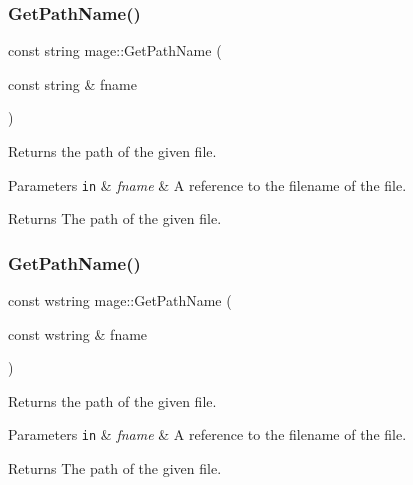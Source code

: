 \hypertarget{namespacemage_ab3642c6ef6cf94a62fb37b40c3c2f57e}{}\label{namespacemage_ab3642c6ef6cf94a62fb37b40c3c2f57e} 
\subsubsection{\texorpdfstring{Get\+Path\+Name()}{GetPathName()}\hspace{0.1cm}{\footnotesize\ttfamily [1/2]}}
{\footnotesize\ttfamily const string mage\+::\+Get\+Path\+Name (\begin{DoxyParamCaption}\item[{const string \&}]{fname }\end{DoxyParamCaption})}

Returns the path of the given file.


\begin{DoxyParams}[1]{Parameters}
\mbox{\tt in}  & {\em fname} & A reference to the filename of the file. \\
\hline
\end{DoxyParams}
\begin{DoxyReturn}{Returns}
The path of the given file. 
\end{DoxyReturn}
\hypertarget{namespacemage_ad23faa6d1854d389eb37fbdeefe97361}{}\label{namespacemage_ad23faa6d1854d389eb37fbdeefe97361} 
\subsubsection{\texorpdfstring{Get\+Path\+Name()}{GetPathName()}\hspace{0.1cm}{\footnotesize\ttfamily [2/2]}}
{\footnotesize\ttfamily const wstring mage\+::\+Get\+Path\+Name (\begin{DoxyParamCaption}\item[{const wstring \&}]{fname }\end{DoxyParamCaption})}

Returns the path of the given file.


\begin{DoxyParams}[1]{Parameters}
\mbox{\tt in}  & {\em fname} & A reference to the filename of the file. \\
\hline
\end{DoxyParams}
\begin{DoxyReturn}{Returns}
The path of the given file. 
\end{DoxyReturn}
\hypertarget{namespacemage_ad86bf56ff188b6519ddc0f0df8eaac20}{}\label{namespacemage_ad86bf56ff188b6519ddc0f0df8eaac20} 
